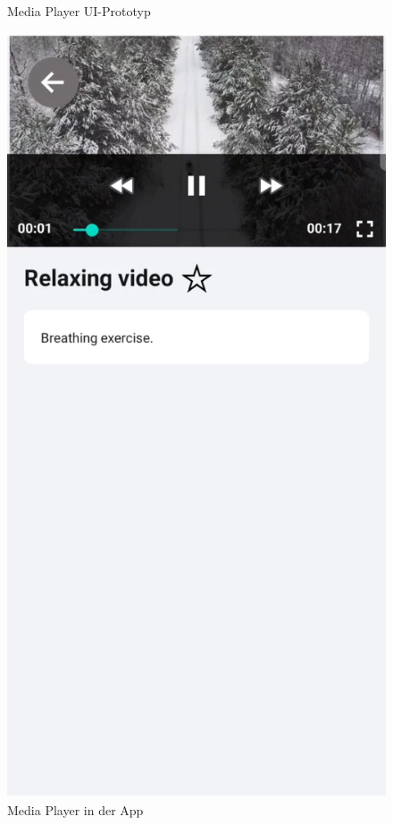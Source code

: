 \begin{figure}[H]
\begin{minipage}{0.5\textwidth}
        \caption{Media Player UI-Prototyp}
    \end{minipage}
    \begin{minipage}{0.5\textwidth}
        \centering
        \includegraphics[height=2\textwidth]{./pics/MediaPlayer.jpg}
        \caption{Media Player in der App}
    \end{minipage}
\end{figure}

